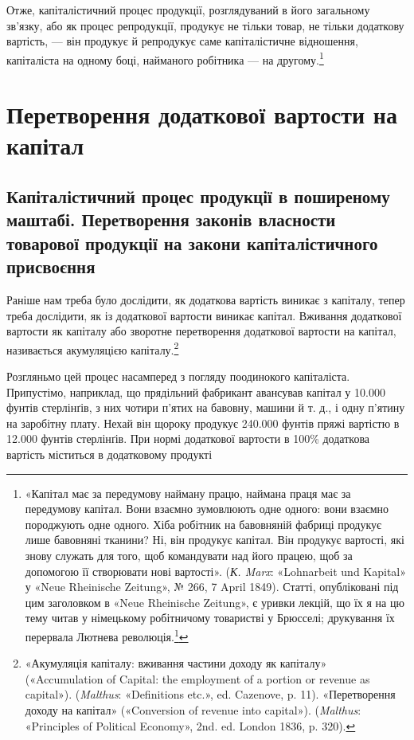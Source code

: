 Отже, капіталістичний процес продукції, розглядуваний в
його загальному зв’язку, або як процес репродукції, продукує
не тільки товар, не тільки додаткову вартість, — він продукує
й репродукує саме капіталістичне відношення, капіталіста на
одному боці, найманого робітника — на другому.\footnote{
«Капітал має за передумову найману працю, наймана праця має за передумову
капітал. Вони взаємно зумовлюють одне одного: вони взаємно породжують одне
одного. Хіба робітник на бавовняній фабриці
продукує лише бавовняні тканини? Ні, він продукує капітал. Він продукує
вартості, які знову служать для того, щоб командувати над його працею, щоб за
допомогою її створювати нові вартості». (\emph{К. Marx}:
«Lohnarbeit und Kapital» у «Neue Rheinische Zeitung», № 266, 7 April 1849).
Статті, опубліковані під цим заголовком в «Neue Rheinische Zeitung», є уривки
лекцій, що їх я на цю тему читав у німецькому
робітничому товаристві у Брюсселі; друкування їх перервала Лютнева
революція.\footnote*{
Статті ці з’явилися потім окремою брошурою і під тією ж назвою.
Є українське видання: Партвидав «Пролетар» 1932 р. \emph{Ред.}
}
}

\section{Перетворення додаткової вартости на капітал}

\subsection{Капіталістичний процес продукції в поширеному маштабі.
Перетворення законів власности товарової продукції на закони
капіталістичного присвоєння}

Раніше нам треба було дослідити, як додаткова вартість виникає
з капіталу, тепер треба дослідити, як із додаткової вартости
виникає капітал. Вживання додаткової вартости як капіталу
або зворотне перетворення додаткової вартости на капітал, називається
акумуляцією капіталу.\footnote{
«Акумуляція капіталу: вживання частини доходу як капіталу» («Accumulation of
Capital: the employment of a portion or revenue as capital»). (\emph{Malthus}:
«Definitions etc.», ed. Cazenove, p. 11).
«Перетворення доходу на капітал» («Conversion of revenue into capital»).
(\emph{Malthus}: «Principles of Political Economy», 2nd. ed. London 1836, p. 320).
}

Розгляньмо цей процес насамперед з погляду поодинокого капіталіста. Припустімо,
наприклад, що прядільний фабрикант авансував капітал у 10.000 фунтів стерлінґів,
з них чотири п’ятих на бавовну, машини й т. д., і одну п’ятину на заробітну
плату. Нехай він щороку продукує 240.000 фунтів пряжі
вартістю в 12.000 фунтів стерлінґів. При нормі додаткової вартости в 100\%
додаткова вартість міститься в додатковому продукті
\parbreak{}  %
